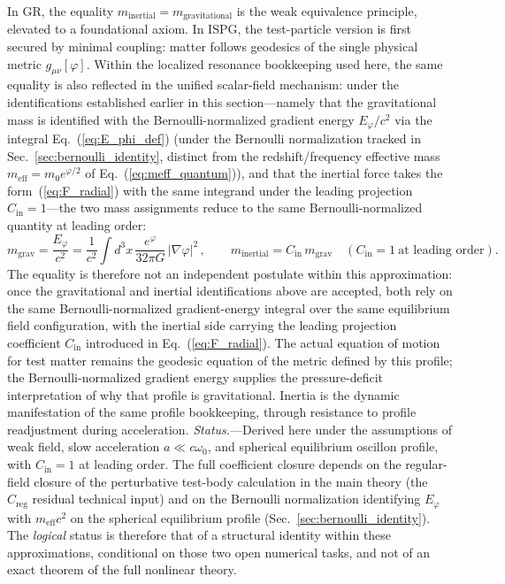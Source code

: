 \documentclass[aps,prd,onecolumn,superscriptaddress,nofootinbib,showpacs,12pt,notitlepage]{revtex4-2}
\begin{document}
In GR, the equality $m_{\mathrm{inertial}} =
m_{\mathrm{gravitational}}$ is the weak equivalence
principle, elevated to a foundational axiom.  In ISPG, the
test-particle version is first secured by minimal coupling:
matter follows geodesics of the single physical metric
$g_{\mu\nu}[\varphi]$.  Within the localized resonance
bookkeeping used here, the same equality is also reflected in the
unified scalar-field mechanism: under the identifications
established earlier in this section---namely that the
gravitational mass is identified with the
Bernoulli-normalized gradient energy $E_{\varphi}/c^{2}$
via the integral Eq.~(\ref{eq:E_phi_def}) (under the
Bernoulli normalization tracked in
Sec.~\ref{sec:bernoulli_identity}, distinct from the
redshift/frequency effective mass
$m_{\mathrm{eff}}=m_{0}e^{\varphi/2}$ of
Eq.~(\ref{eq:meff_quantum})), and that the inertial
force takes the form~(\ref{eq:F_radial}) with the same
integrand under the leading projection
$C_{\mathrm{in}}=1$---the two mass assignments reduce to
the same Bernoulli-normalized quantity at leading order:
\begin{equation}\label{eq:equivalence}
  m_{\mathrm{grav}} = \frac{E_{\varphi}}{c^2}
  = \frac{1}{c^2}\int d^3x\,
    \frac{e^{\varphi}}{32\pi G}\,|\nabla\varphi|^2
  \,,\qquad
  m_{\mathrm{inertial}}
  = C_{\mathrm{in}}\,m_{\mathrm{grav}}
  \quad (C_{\mathrm{in}}=1\ \text{at leading order}).
\end{equation}
The equality is therefore not an independent postulate
within this approximation: once the gravitational and inertial
identifications above are accepted, both rely on the same
Bernoulli-normalized gradient-energy integral over the same
equilibrium field configuration, with the inertial side carrying
the leading projection coefficient $C_{\mathrm{in}}$ introduced in
Eq.~(\ref{eq:F_radial}).
The actual equation of motion for test matter remains the
geodesic equation of the metric defined by this profile; the
Bernoulli-normalized gradient energy supplies the
pressure-deficit interpretation of why that profile is
gravitational.  Inertia is the dynamic manifestation of the same
profile bookkeeping, through resistance to profile readjustment
during acceleration.
\emph{Status.}---Derived here under the assumptions of
weak field, slow acceleration $a \ll c\omega_{0}$, and
spherical equilibrium oscillon profile, with
$C_{\mathrm{in}}=1$ at leading order.  The full coefficient
closure depends on the regular-field closure of the
perturbative test-body calculation in the main theory
(the $C_{\mathrm{reg}}$ residual technical input) and on the
Bernoulli normalization identifying $E_{\varphi}$ with
$m_{\mathrm{eff}}c^{2}$ on the spherical equilibrium profile
(Sec.~\ref{sec:bernoulli_identity}).  The
\emph{logical} status is therefore that of a structural identity
within these approximations, conditional on those two open
numerical tasks, and not of an exact theorem of the full nonlinear
theory.
\end{document}
